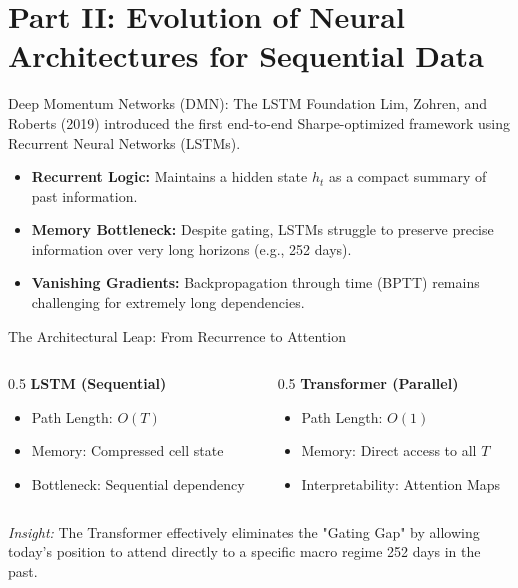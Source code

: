 \section{Part II: Evolution of Neural Architectures for Sequential Data}

\begin{frame}{Deep Momentum Networks (DMN): The LSTM Foundation}
    Lim, Zohren, and Roberts (2019) introduced the first end-to-end Sharpe-optimized framework using Recurrent Neural Networks (LSTMs).
    \begin{itemize}
        \item \textbf{Recurrent Logic:} Maintains a hidden state $h_t$ as a compact summary of past information.
        \item \textbf{Memory Bottleneck:} Despite gating, LSTMs struggle to preserve precise information over very long horizons (e.g., 252 days).
        \item \textbf{Vanishing Gradients:} Backpropagation through time (BPTT) remains challenging for extremely long dependencies.
    \end{itemize}
\end{frame}

\begin{frame}{The Architectural Leap: From Recurrence to Attention}
    \begin{columns}
        \begin{column}{0.5\textwidth}
            \textbf{LSTM (Sequential)}
            \begin{itemize}
                \item Path Length: $O(T)$
                \item Memory: Compressed cell state
                \item Bottleneck: Sequential dependency
            \end{itemize}
        \end{column}
        \begin{column}{0.5\textwidth}
            \textbf{Transformer (Parallel)}
            \begin{itemize}
                \item Path Length: $O(1)$
                \item Memory: Direct access to all $T$
                \item Interpretability: Attention Maps
            \end{itemize}
        \end{column}
    \end{columns}
    \textit{Insight:} The Transformer effectively eliminates the "Gating Gap" by allowing today's position to attend directly to a specific macro regime 252 days in the past.
\end{frame}

